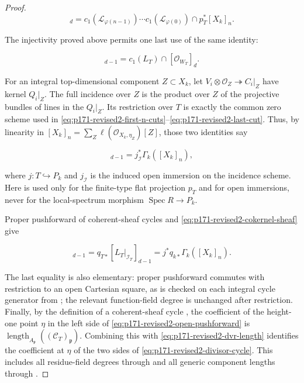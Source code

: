 \begin{proof}
\begin{equation}
 [\mathcal O_{W_T}]_d
 =c_1(\mathcal L_{\varphi(n-1)})\cdots
  c_1(\mathcal L_{\varphi(0)})\cap p_T^*[X_k]_n.
 \label{eq:p171-revised2-first-n-cuts}
\end{equation}

The injectivity proved above permits one last use of the same identity:

\begin{equation}
 [L_T|_{\mathcal I_T}]_{d-1}
 =c_1(L_T)\cap[\mathcal O_{W_T}]_d.
 \label{eq:p171-revised2-last-cut}
\end{equation}

For an integral top-dimensional component \(Z\subset X_k\), let
\(V_i\otimes\mathcal O_Z\twoheadrightarrow C_i|_Z\) have kernel
\(Q_i|_Z\).  The full incidence over \(Z\) is the product over \(Z\) of
the projective bundles of lines in the \(Q_i|_Z\).  Its restriction over
\(T\) is exactly the common zero scheme used in
\eqref{eq:p171-revised2-first-n-cuts}--\eqref{eq:p171-revised2-last-cut}.
Thus, by linearity in
\([X_k]_n=\sum_Z\ell(\mathcal O_{X_k,\eta_Z})[Z]\), those two identities
say

\begin{equation}
 [L_T|_{\mathcal I_T}]_{d-1}
 =j_{\mathcal I}^*\Gamma_k([X_k]_n),
 \label{eq:p171-revised2-incidence-restriction}
\end{equation}

where \(j:T\hookrightarrow P_k\) and \(j_{\mathcal I}\) is the induced
open immersion on the incidence scheme.  Here
\cite[Tag~02RA]{stacks-project} is used
only for the finite-type flat projection \(p_T\) and for open immersions,
never for the local-spectrum morphism
\(\operatorname{Spec}R\to P_k\).

Proper pushforward of coherent-sheaf cycles
\cite[Lemma~42.12.4, Tag~02R3]{stacks-project} and
\eqref{eq:p171-revised2-cokernel-sheaf} give

\begin{equation}
 [\mathcal C_T]_{d-1}
 =q_{T*}[L_T|_{\mathcal I_T}]_{d-1}
 =j^*q_{k*}\Gamma_k([X_k]_n).
 \label{eq:p171-revised2-open-pushforward}
\end{equation}

The last equality is also elementary: proper pushforward commutes with
restriction to an open Cartesian square, as is checked on each integral
cycle generator from
\cite[Definitions~42.12.1 and~42.14.1]{stacks-project}; the relevant
function-field degree is unchanged after restriction.  Finally, by the
definition of a coherent-sheaf cycle \cite[Tag~02QV]{stacks-project}, the
coefficient
of the height-one point \(\eta\) in the left side of
\eqref{eq:p171-revised2-open-pushforward} is
\(\operatorname{length}_{A_\mathfrak p}((\mathcal C_T)_\mathfrak p)\).
Combining this with \eqref{eq:p171-revised2-dvr-length} identifies the
coefficient at \(\eta\) of the two sides of
\eqref{eq:p171-revised2-divisor-cycle}.  This includes all residue-field
degrees through \cite[Tag~02R3]{stacks-project} and all generic component
lengths through \cite[Tag~02QV]{stacks-project}.


\end{proof}
